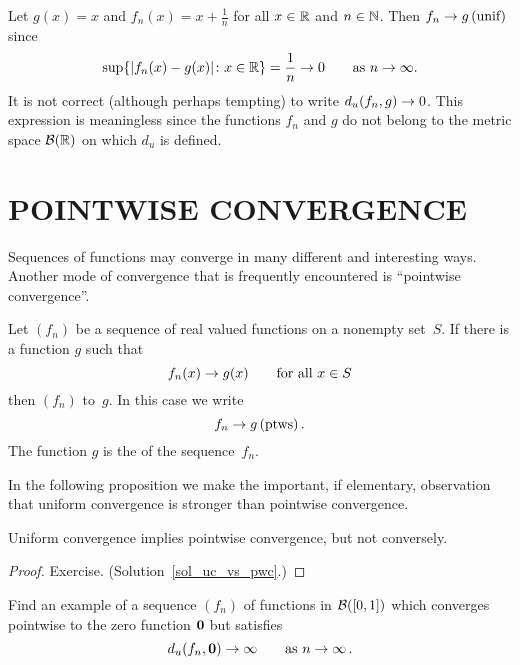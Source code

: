 \begin{exam} Let $g(x) = x$ and $f_n(x) = x + \frac1n$ for all $x \in \mathbb{R}$ and $n \in \mathbb{N}$.
Then $f_n \rightarrow g \text{\,(unif)}$ since
   \[ \sup\{\lvert f_n(x) - g(x)\rvert\colon  x \in \mathbb{R}\} = \frac1n \rightarrow 0
                      \qquad\text{as $n \rightarrow \infty$}.\]
It is not correct (although perhaps tempting) to write $d_u(f_n,g) \rightarrow 0$.  This expression
is meaningless since the functions $f_n$ and $g$ do not belong to the metric space $\mathcal{B}(\mathbb{R})$ on which $d_u$ is defined.
\end{exam}





\section{POINTWISE CONVERGENCE}
Sequences of functions may converge in many different and interesting ways.  Another mode of
convergence that is frequently encountered is ``pointwise convergence''.


\begin{defn}\label{def_pc_R}  Let $(f_n)$ be a sequence of real valued functions on a nonempty
set~$S$.  If there is a function $g$ such that
   \[ f_n(x) \rightarrow g(x) \qquad\text{for all $x \in S$} \]
then $(f_n)$
 to~$g$. In this case we write
   \[ f_n \rightarrow g \text{\,(ptws)} \,. \]
The function $g$ is the
 of the sequence~$f_n$.
\end{defn}

In the following proposition we make the important, if elementary, observation that uniform
convergence is stronger than pointwise convergence.

\begin{prop}\label{uc_vs_pwc} Uniform convergence implies pointwise convergence, but not conversely.
\end{prop}

\begin{proof} Exercise. (Solution~\ref{sol_uc_vs_pwc}.)   \ns \end{proof}

\begin{prob} Find an example of a sequence $(f_n)$ of functions in $\mathcal{B}([0,1])$ which
converges pointwise to the zero function $\mathbf{0}$ but satisfies
  \[ d_u(f_n,\mathbf{0}) \rightarrow \infty \qquad \text{as $n \rightarrow \infty$}\,. \]
\end{prob}

